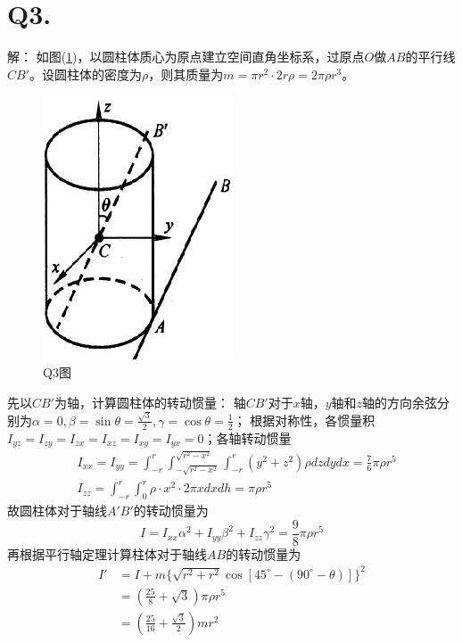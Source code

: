 \documentclass[10pt,a4paper]{article}
\theoremstyle{remark}
\begin{document}
\section*{Q3.}解：
如图(\ref{FigureofHomework_2Problem_3})，以圆柱体质心为原点建立空间直角坐标系，过原点$O$做$AB$的平行线$CB'$。设圆柱体的密度为$\rho$，则其质量为$m = \pi r^2\cdot2r\rho = 2\pi\rho r^3$。
\begin{figure}[h]
\centering
\includegraphics[scale=1]{FigureofHomework_2Problem_3.jpg}
\caption{Q3图}\label{FigureofHomework_2Problem_3}
\end{figure}

先以$CB'$为轴，计算圆柱体的转动惯量：
轴$CB'$对于$x$轴，$y$轴和$z$轴的方向余弦分别为$\alpha = 0, \beta = \sin\theta = \frac{\sqrt{3}}{2}, \gamma = \cos\theta = \frac{1}{2}$；
根据对称性，各惯量积$I_{yz} = I_{zy} = I_{zx} = I_{xz} = I_{xy} = I_{yx} = 0$；各轴转动惯量
\begin{align*}
&I_{xx} = I_{yy} = \int_{-r}^{r}\int_{-\sqrt{r^2 - x^2}}^{\sqrt{r^2 - x^2}}\int_{-r}^{r}(y^2 + z^2)\rho dzdydx = \frac{7}{6}\pi\rho r^5\\
&I_{zz} = \int_{-r}^{r}\int_0^{r}\rho\cdot x^2\cdot2\pi xdxdh = \pi\rho r^5
\end{align*}
故圆柱体对于轴线$A'B'$的转动惯量为
\[
I = I_{xx}\alpha^2 + I_{yy}\beta^2 + I_{zz}\gamma^2 = \frac{9}{8}\pi\rho r^5
\]
再根据平行轴定理计算柱体对于轴线$AB$的转动惯量为
\begin{align*}
I' &= I + m\{\sqrt{r^2 + r^2}\cos[45^{\circ} - (90^{\circ} - \theta)]\}^2\\
&= (\frac{25}{8} + \sqrt{3})\pi\rho r^5\\
&= (\frac{25}{16} + \frac{\sqrt{3}}{2})mr^2
\end{align*}
\end{document}
